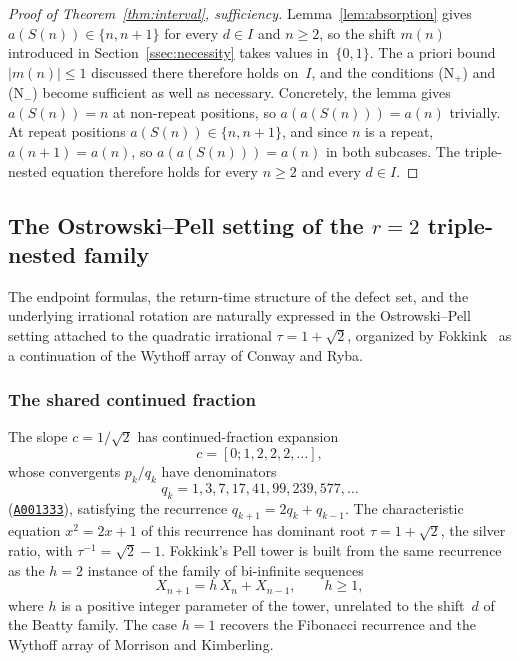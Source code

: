 \documentclass{birkjour}
\theoremstyle{definition}
\theoremstyle{remark}
\begin{document}
\begin{proof}[Proof of Theorem~\ref{thm:interval}, sufficiency]
Lemma~\ref{lem:absorption} gives $a(S(n))\in\{n,n+1\}$
for every $d\in I$ and $n\ge 2$, so the shift $m(n)$
introduced in Section~\ref{ssec:necessity} takes
values in~$\{0,1\}$. The a priori bound
$|m(n)|\le 1$ discussed there therefore holds on~$I$,
and the conditions (N$_{+}$) and (N$_{-}$) become
sufficient as well as necessary. Concretely, the
lemma gives $a(S(n))=n$ at non-repeat positions, so
$a(a(S(n)))=a(n)$ trivially. At repeat positions
$a(S(n))\in\{n,n+1\}$, and since $n$ is a repeat,
$a(n{+}1)=a(n)$, so $a(a(S(n)))=a(n)$ in both
subcases. The triple-nested equation therefore holds
for every $n\ge 2$ and every $d\in I$.
\end{proof}

\subsection{The Ostrowski--Pell setting of the \texorpdfstring{$r=2$}{r=2} triple-nested family}
\label{sec:pell_ostrowski}

The endpoint formulas, the return-time structure
of the defect set, and the underlying irrational
rotation are naturally expressed in the
Ostrowski--Pell setting attached to the
quadratic irrational $\tau=1+\sqrt{2}$, organized
by Fokkink~\cite{Fokkink} as a continuation of the
Wythoff array of Conway and Ryba.

\subsubsection*{The shared continued fraction}

The slope $c=1/\!\sqrt{2}$ has continued-fraction
expansion
\[
  c=[0;1,2,2,2,\ldots],
\]
whose convergents $p_{k}/q_{k}$ have denominators
\[
  q_{k}=1,3,7,17,41,99,239,577,\ldots
\]
(\href{https://oeis.org/A001333}{\texttt{A001333}}),
satisfying the recurrence
$q_{k+1}=2q_{k}+q_{k-1}$. The characteristic
equation $x^{2}=2x+1$ of this recurrence has
dominant root $\tau=1+\sqrt{2}$, the silver ratio, with
$\tau^{-1}=\sqrt{2}-1$.
Fokkink's Pell tower is built from the same
recurrence as the $h=2$ instance of the family
of bi-infinite sequences
\[
  X_{n+1}=h\,X_{n}+X_{n-1}, \qquad h\ge 1,
\]
where $h$ is a positive integer parameter of the
tower, unrelated to the shift~$d$ of the Beatty
family. The case $h=1$ recovers the Fibonacci
recurrence and the Wythoff array of Morrison and
Kimberling.
\end{document}

